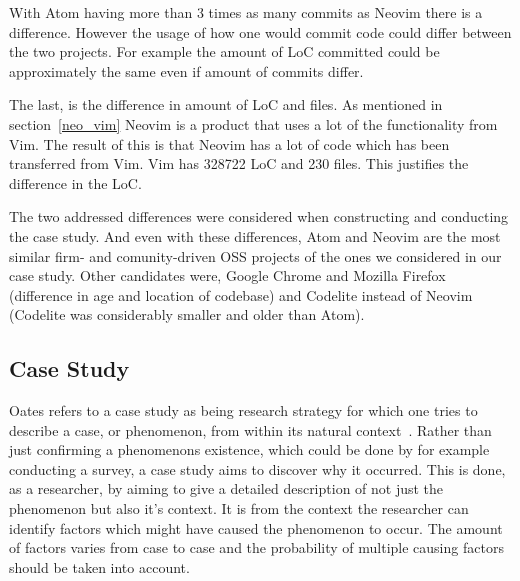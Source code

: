 \documentclass[a4paper,11pt]{article}
\begin{document}
{With Atom having more than 3 times as many commits as Neovim there is a difference. However the usage of how one would commit code could differ between the two projects. For example the amount of LoC committed could be approximately the same even if amount of commits differ.

The last, is the difference in amount of LoC and files. As mentioned in section~\ref{neo_vim} Neovim is a product that uses a lot of the functionality from Vim. The result of this is that Neovim has a lot of code which has been transferred from Vim. Vim has 328722 LoC and 230 files. This justifies the difference in the LoC.

The two addressed differences were considered when constructing and conducting the case study. And even with these differences, Atom and Neovim are the most similar firm- and comunity-driven OSS projects of the ones we considered in our case study. Other candidates were, Google Chrome and Mozilla Firefox (difference in age and location of codebase) and Codelite instead of Neovim (Codelite was considerably smaller and older than Atom).

\subsection{Case Study}
Oates refers to a case study as being research strategy for which one tries to describe a case, or phenomenon, from within its natural context~\cite{Oates2005}. Rather than just confirming a phenomenons existence, which could be done by for example conducting a survey, a case study aims to discover why it occurred. This is done, as a researcher, by aiming to give a detailed description of not just the phenomenon but also it's context. It is from the context the researcher can identify factors which might have caused the phenomenon to occur. The amount of factors varies from case to case and the probability of multiple causing factors should be taken into account.

}
\end{document}
